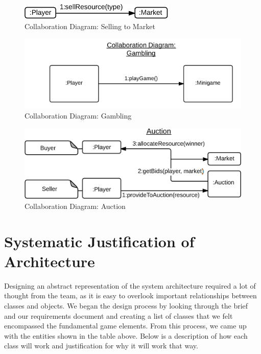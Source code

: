 \begin{figure}
	\begin{centering}
		\includegraphics[]{figures/collab6.png}
		\caption{Collaboration Diagram: Selling to Market}
		\label{fig:collab6}
	\end{centering}
\end{figure}
\begin{figure}
	\begin{centering}
		\includegraphics[]{figures/collab7.png}
		\caption{Collaboration Diagram: Gambling}
		\label{fig:collab7}
	\end{centering}
\end{figure}
\begin{figure}
	\begin{centering}
		\includegraphics[width=\textwidth]{figures/collab8.png}
		\caption{Collaboration Diagram: Auction}
		\label{fig:collab8}
	\end{centering}
\end{figure}


\section{Systematic Justification of Architecture}
Designing an abstract representation of the system architecture required a lot of thought from the team, as it is easy to overlook important relationships between classes and objects.
We began the design process by looking through the brief and our requirements document and creating a list of classes that we felt encompassed the fundamental game elements.
From this process, we came up with the entities shown in the table above.
Below is a description of how each class will work and justification for why it will work that way.

